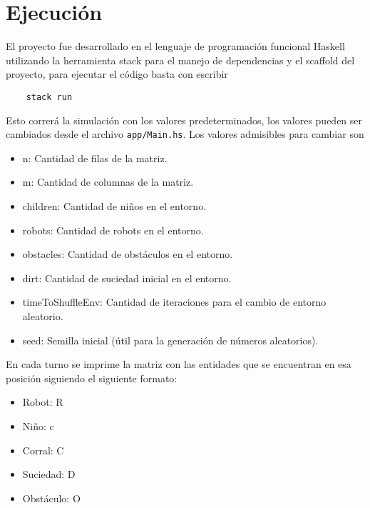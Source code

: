 \documentclass[]{article}
\begin{document}
\section{Ejecución}

\begin{flushleft}
	El proyecto fue desarrollado en el lenguaje de programación funcional Haskell utilizando la herramienta stack para el manejo de dependencias y el scaffold del proyecto, para ejecutar el código basta con escribir
\end{flushleft}

\begin{verbatim}
	stack run
\end{verbatim}

\begin{flushleft}
	Esto correrá la simulación con los valores predeterminados, los valores pueden ser cambiados desde el archivo \verb*|app/Main.hs|. Los valores admisibles para cambiar son
\end{flushleft}

\begin{itemize}
	\item n: Cantidad de filas de la matriz.
	\item m: Cantidad de columnas de la matriz.
	\item children: Cantidad de niños en el entorno.
	\item robots: Cantidad de robots en el entorno.
	\item obstacles: Cantidad de obstáculos en el entorno.
	\item dirt: Cantidad de suciedad inicial en el entorno.
	\item timeToShuffleEnv: Cantidad de iteraciones para el cambio de entorno aleatorio.
	\item seed: Semilla inicial (útil para la generación de números aleatorios).
\end{itemize}

\begin{flushleft}
	En cada turno se imprime la matriz con las entidades que se encuentran en esa posición siguiendo el siguiente formato:
\end{flushleft}

\begin{itemize}
	\item Robot: R
	\item Niño: c
	\item Corral: C
	\item Suciedad: D
	\item Obstáculo: O
\end{itemize}
\end{document}
